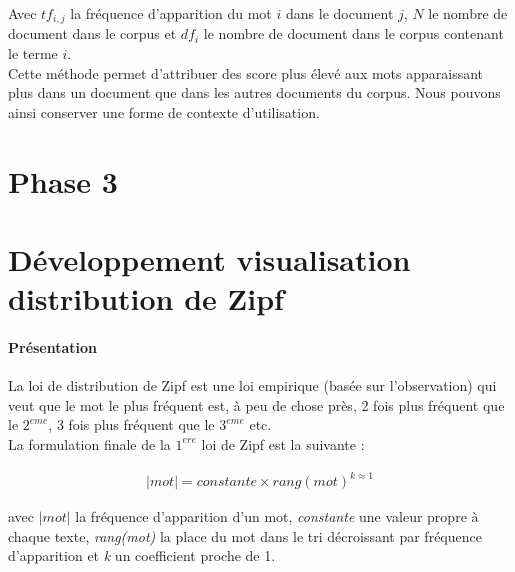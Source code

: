 \documentclass[a4paper,12pt]{article}
\begin{document}
			Avec $tf_{i,j}$ la fréquence d'apparition du mot $i$ dans le document $j$, $N$ le nombre de document dans le corpus et $df_{i}$ le nombre de document dans le corpus contenant le terme $i$. \\
			Cette méthode permet d'attribuer des score plus élevé aux mots apparaissant plus dans un document que dans les autres documents du corpus. Nous pouvons ainsi conserver une forme de contexte d'utilisation. 

			
			
			



\newpage
\section{Phase 3}



\newpage	
\appendix
\section{Développement visualisation distribution de Zipf}
	\label{sec:devZipf}
	\paragraph{Présentation}
		La loi de distribution de Zipf est une loi empirique (basée sur l'observation) qui veut que le mot le plus fréquent est, à peu de chose près, 2 fois plus fréquent que le $2^{eme}$, 3 fois plus fréquent que le $3^{eme}$ etc.\\
		
		La formulation finale de la $1^{ere}$ loi de Zipf est la suivante :
		
		\begin{align*}
				|mot| = constante \times rang(mot)^{k \approx 1}
		\end{align*}
		
		avec \emph{$|mot|$} la fréquence d'apparition d'un mot, \emph{constante} une valeur propre à chaque texte, \emph{rang(mot)} la place du mot dans le tri décroissant par fréquence d'apparition et \emph{k} un coefficient proche de 1. 
		
\end{document}

